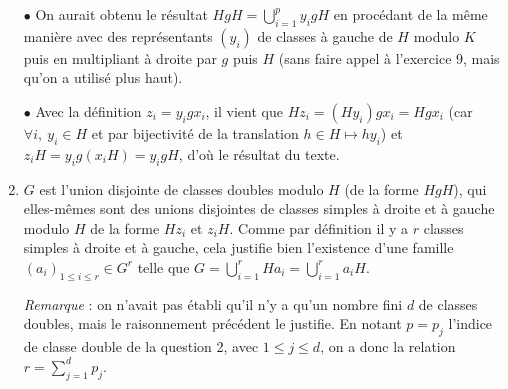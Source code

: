 \begin{enumerate}
 $\bullet$ On aurait obtenu le résultat  $HgH =  \bigcup_{i=1}^p y_igH$ en procédant de la même manière avec des représentants $(y_i)$ de classes à gauche de $H$ modulo $K$ puis en multipliant à droite par $g$ puis $H$ (sans faire appel à l'exercice 9, mais qu'on a utilisé plus haut).
 
 $\bullet$ Avec la définition $z_i = y_igx_i$, il vient que $Hz_i = (Hy_i) gx_i = Hgx_i$ (car $\forall i,~ y_i\in H$ et par bijectivité de la translation $h\in H \mapsto hy_i$) et $z_iH = y_ig(x_iH) = y_igH$, d'où le résultat du texte.
 
 \item $G$ est l'union disjointe de classes doubles modulo $H$ (de la forme $HgH$), qui elles-mêmes sont des unions disjointes de classes simples à droite et à gauche modulo $H$ de la forme $Hz_i$ et $z_iH$. Comme par définition il y a $r$ classes simples à droite et à gauche, cela justifie bien l'existence d'une famille $(a_i)_{1\leqslant i \leqslant r} \in G^r$ telle que $G =  \bigcup_{i=1}^r Ha_i =  \bigcup_{i=1}^r a_iH$.
 
 \emph{Remarque} : on n'avait pas établi qu'il n'y a qu'un nombre fini $d$ de classes doubles, mais le raisonnement précédent le justifie. En notant $p=p_j$ l'indice de classe double de la question 2, avec $1\leqslant j\leqslant d$, on a donc la relation $r = \sum\limits_{j=1}^d p_j$.   
\end{enumerate}

